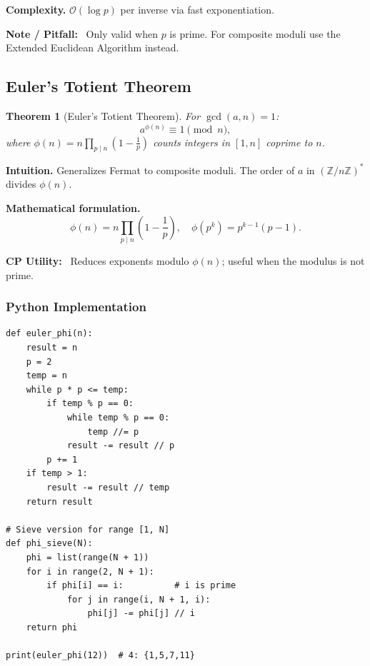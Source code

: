 \documentclass[10pt,a4paper]{article}
\theoremstyle{cpstyle}
\newtheorem{theorem}{Theorem}[section]
\newenvironment{cpnote}{%
  \begin{mdframed}[backgroundcolor=notebg, linecolor=orange!70, linewidth=1pt,
    innerleftmargin=10pt, innerrightmargin=10pt, innertopmargin=6pt, innerbottommargin=6pt]
  \textbf{\color{orange!80!black}Note / Pitfall:}~}{%
  \end{mdframed}}
\newenvironment{cputility}{%
  \begin{mdframed}[backgroundcolor=theorembg, linecolor=accent!50, linewidth=1pt,
    innerleftmargin=10pt, innerrightmargin=10pt, innertopmargin=6pt, innerbottommargin=6pt]
  \textbf{\color{accent}CP Utility:}~}{%
  \end{mdframed}}
\newcommand{\bigO}[1]{\mathcal{O}\!\left(#1\right)}
\newcommand{\Z}{\mathbb{Z}}
\begin{document}
\textbf{Complexity.} $\bigO{\log p}$ per inverse via fast exponentiation.

\begin{cpnote}
Only valid when $p$ is prime. For composite moduli use the Extended Euclidean Algorithm instead.
\end{cpnote}

\subsection{Euler's Totient Theorem}

\begin{theorem}[Euler's Totient Theorem]
For $\gcd(a, n) = 1$:
\[
  a^{\phi(n)} \equiv 1 \pmod{n},
\]
where $\phi(n) = n \prod_{p \mid n}\left(1 - \tfrac{1}{p}\right)$ counts integers in $[1,n]$ coprime to $n$.
\end{theorem}

\textbf{Intuition.} Generalizes Fermat to composite moduli. The order of $a$ in $(\Z/n\Z)^*$ divides $\phi(n)$.

\textbf{Mathematical formulation.}
\[
  \phi(n) = n \prod_{p \mid n} \left(1 - \frac{1}{p}\right), \quad \phi(p^k) = p^{k-1}(p-1).
\]

\begin{cputility}
Reduces exponents modulo $\phi(n)$; useful when the modulus is not prime.
\end{cputility}

\subsubsection{Python Implementation}
\begin{lstlisting}[caption={Euler's Totient Function}]
def euler_phi(n):
    result = n
    p = 2
    temp = n
    while p * p <= temp:
        if temp % p == 0:
            while temp % p == 0:
                temp //= p
            result -= result // p
        p += 1
    if temp > 1:
        result -= result // temp
    return result

# Sieve version for range [1, N]
def phi_sieve(N):
    phi = list(range(N + 1))
    for i in range(2, N + 1):
        if phi[i] == i:          # i is prime
            for j in range(i, N + 1, i):
                phi[j] -= phi[j] // i
    return phi

print(euler_phi(12))  # 4: {1,5,7,11}
\end{lstlisting}
\end{document}
